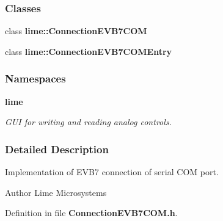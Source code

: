 \subsubsection*{Classes}
\begin{DoxyCompactItemize}
\item 
class {\bf lime\+::\+Connection\+E\+V\+B7\+C\+OM}
\item 
class {\bf lime\+::\+Connection\+E\+V\+B7\+C\+O\+M\+Entry}
\end{DoxyCompactItemize}
\subsubsection*{Namespaces}
\begin{DoxyCompactItemize}
\item 
 {\bf lime}
\begin{DoxyCompactList}\small\item\em G\+UI for writing and reading analog controls. \end{DoxyCompactList}\end{DoxyCompactItemize}


\subsubsection{Detailed Description}
Implementation of E\+V\+B7 connection of serial C\+OM port. 

\begin{DoxyAuthor}{Author}
Lime Microsystems 
\end{DoxyAuthor}


Definition in file {\bf Connection\+E\+V\+B7\+C\+O\+M.\+h}.

